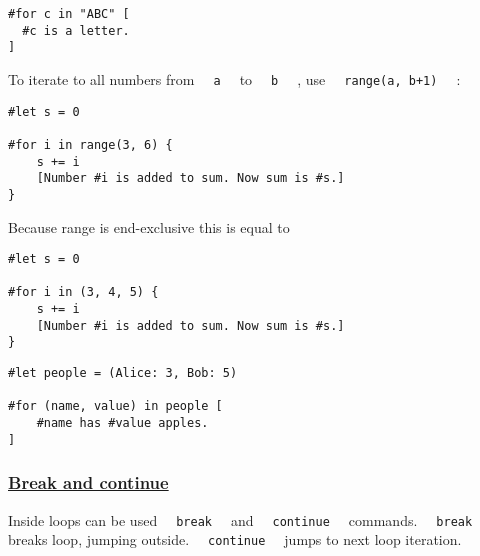 \begin{verbatim}
#for c in "ABC" [
  #c is a letter.
]
\end{verbatim}

\pandocbounded{}

To iterate to all numbers from \texttt{\ }{\texttt{\ a\ }}\texttt{\ } to
\texttt{\ }{\texttt{\ b\ }}\texttt{\ } , use
\texttt{\ }{\texttt{\ range(a,\ b+1)\ }}\texttt{\ } :

\begin{verbatim}
#let s = 0

#for i in range(3, 6) {
    s += i
    [Number #i is added to sum. Now sum is #s.]
}
\end{verbatim}

\pandocbounded{}

Because range is end-exclusive this is equal to

\begin{verbatim}
#let s = 0

#for i in (3, 4, 5) {
    s += i
    [Number #i is added to sum. Now sum is #s.]
}
\end{verbatim}

\pandocbounded{}

\begin{verbatim}
#let people = (Alice: 3, Bob: 5)

#for (name, value) in people [
    #name has #value apples.
]
\end{verbatim}

\pandocbounded{}

\subsubsection{\texorpdfstring{\hyperref[break-and-continue]{Break and
continue}}{Break and continue}}\label{break-and-continue}

Inside loops can be used \texttt{\ }{\texttt{\ break\ }}\texttt{\ } and
\texttt{\ }{\texttt{\ continue\ }}\texttt{\ } commands.
\texttt{\ }{\texttt{\ break\ }}\texttt{\ } breaks loop, jumping outside.
\texttt{\ }{\texttt{\ continue\ }}\texttt{\ } jumps to next loop
iteration.

